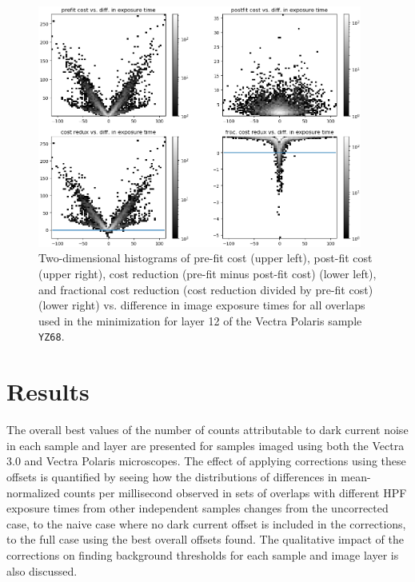 \documentclass[letterpaper,11pt]{article}
\begin{document}
\begin{figure}[!ht]
\centering
\includegraphics[width=0.95\textwidth]{images/methods/cost_reduction_plots_2d_YZ68_layer_12}
\caption{\footnotesize Two-dimensional histograms of pre-fit cost (upper left), post-fit cost (upper right), cost reduction (pre-fit minus post-fit cost) (lower left), and fractional cost reduction (cost reduction divided by pre-fit cost) (lower right) vs. difference in image exposure times for all overlaps used in the minimization for layer 12 of the Vectra Polaris sample \texttt{YZ68}.}
\label{fig:cost_reduction_plots_YZ68_layer_12}
\end{figure}

\clearpage

\section{Results}
\label{sec:results}

The overall best values of the number of counts attributable to dark current noise in each sample and layer are presented for samples imaged using both the Vectra 3.0 and Vectra Polaris microscopes. The effect of applying corrections using these offsets is quantified by seeing how the distributions of differences in mean-normalized counts per millisecond observed in sets of overlaps with different HPF exposure times from other independent samples changes from the uncorrected case, to the naive case where no dark current offset is included in the corrections, to the full case using the best overall offsets found. The qualitative impact of the corrections on finding background thresholds for each sample and image layer is also discussed. 
\end{document}
